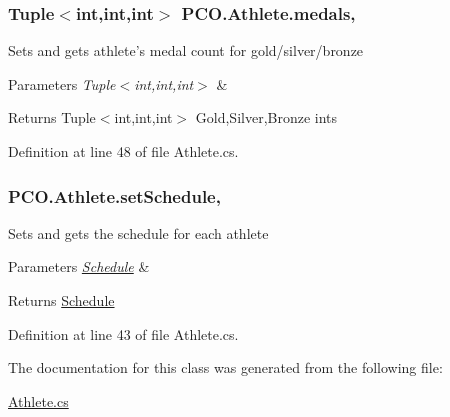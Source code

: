 \hypertarget{classPCO_1_1Athlete_a99ff064c8d40bcb39a7dac132a9146e4}{
\subsubsection[{medals}]{\setlength{\rightskip}{0pt plus 5cm}Tuple$<$int,int,int$>$ P\+C\+O.\+Athlete.\+medals\hspace{0.3cm}{\ttfamily [get]}, {\ttfamily [set]}}}\label{classPCO_1_1Athlete_a99ff064c8d40bcb39a7dac132a9146e4}
Sets and gets athlete's medal count for gold/silver/bronze 
\begin{DoxyParams}{Parameters}
{\em Tuple$<$int,int,int$>$} & \\
\hline
\end{DoxyParams}
\begin{DoxyReturn}{Returns}
Tuple$<$int,int,int$>$ Gold,Silver,Bronze ints 
\end{DoxyReturn}


Definition at line 48 of file Athlete.\+cs.

\hypertarget{classPCO_1_1Athlete_a64a37dcb54d6428079498964da17801d}{
\subsubsection[{set\+Schedule}]{ P\+C\+O.\+Athlete.\+set\+Schedule\hspace{0.3cm}{\ttfamily [get]}, {\ttfamily [set]}}}\label{classPCO_1_1Athlete_a64a37dcb54d6428079498964da17801d}
Sets and gets the schedule for each athlete 
\begin{DoxyParams}{Parameters}
{\em \hyperlink{classPCO_1_1Schedule}{Schedule}} & \\
\hline
\end{DoxyParams}
\begin{DoxyReturn}{Returns}
\hyperlink{classPCO_1_1Schedule}{Schedule} 
\end{DoxyReturn}


Definition at line 43 of file Athlete.\+cs.



The documentation for this class was generated from the following file\+:\begin{DoxyCompactItemize}
\item 
\hyperlink{Athlete_8cs}{Athlete.\+cs}\end{DoxyCompactItemize}
